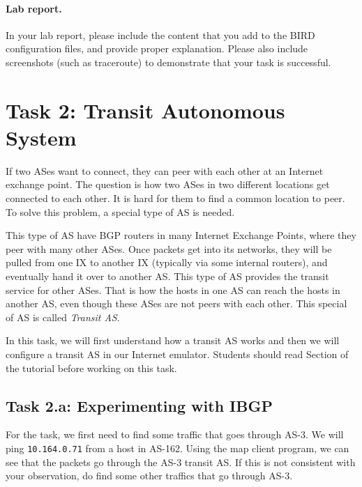 \paragraph{Lab report.}
In your lab report, please include the content that you add to the 
BIRD configuration files, and provide proper explanation.
Please also include screenshots (such as traceroute) to demonstrate 
that your task is successful. 



\section{Task 2: Transit Autonomous System} 

If two ASes want to connect, they can peer with each other
at an Internet exchange point. The question is how two ASes in two different locations
get connected to each other. It is hard for them
to find a common location to peer. To solve this problem,
a special type of AS is needed.

This type of AS have BGP routers in many Internet
Exchange Points, where they peer with many other ASes. Once packets get into
its networks, they will be pulled from one IX to another IX (typically via
some internal routers), and eventually
hand it over to another AS. This type of AS provides the transit
service for other ASes. That is how the hosts in one AS can reach the hosts in
another AS, even though these ASes are not peers with each other.
This special of AS is called \textit{Transit AS}.

In this task, we will first understand how a transit AS works and
then we will configure a transit AS in our Internet emulator. 
Students should read Section \transitas of the tutorial before working on this task.

\subsection{Task 2.a: Experimenting with IBGP} 


For the task, we first need to find some traffic that 
goes through AS-3. We will ping \texttt{10.164.0.71} from a host in AS-162. Using the 
map client program, we can see that the packets go through
the AS-3 transit AS. If this is not consistent with your observation,
do find some other traffics that go through AS-3. 

